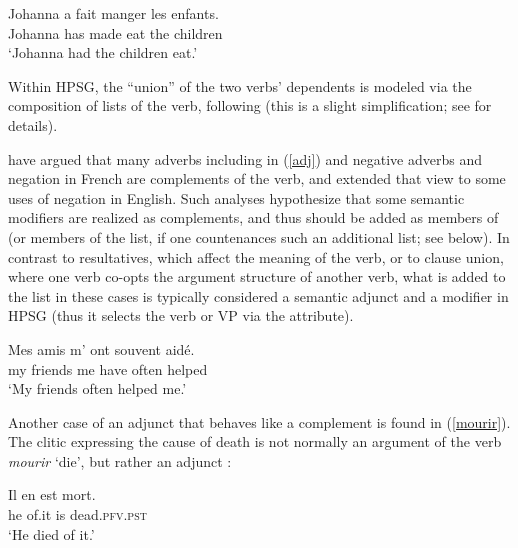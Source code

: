 \documentclass[output=paper
	        ,collection
	        ,collectionchapter
 	        ,biblatex
                ,babelshorthands
                ,newtxmath
                ,draftmode
                ,colorlinks, citecolor=brown
]{langscibook}
\begin{document}
\begin{exe}
\ex \label{faire}
\gll Johanna a fait manger les enfants. \\
Johanna has made eat the children \\
\glt `Johanna had the children eat.'
\end{exe}

\noindent
Within HPSG, the ``union'' of the two verbs' dependents is modeled via the composition of \argst lists of the  verb, following \citet{HinrichsandNakazawa1994} (this is a slight simplification; see   for details). 




\citet{AbeilleandGodard1997} have argued that many adverbs  including  in (\ref{adj}) and negative adverbs and negation in French are complements of the verb, and \citet{KimandSag2002} extended that view to some uses of negation in English. Such analyses hypothesize that some semantic modifiers are realized as complements, and thus should be added as members of \argst (or members of the \deps list, if one countenances such an additional list; see below). In contrast to resultatives,  which affect the meaning of the verb, or to clause union, where one verb co-opts the argument structure of another verb, what is added to the \argst list in these cases is typically considered a semantic adjunct and a modifier in HPSG (thus it selects the verb or VP via the  attribute). 

\begin{exe}
\ex\label{adj}
 \gll
	Mes amis m’ ont souvent aidé. \\
	my friends me have often helped \\
	\glt `My friends often helped me.'
\end{exe}


Another case of an adjunct that behaves like a complement is found in (\ref{mourir}).  The clitic  expressing the cause of death   is not normally an argument of the verb \textit{mourir} `die', but rather an adjunct \citep{KoenigandDavis2006}: %

\begin{exe}
	\ex\label{mourir}
	\gll Il en est mort. \\
	 he of.it is dead.\textsc{pfv.pst} \\
	 \glt `He died of it.' \citep[ex.\ 12a]{KoenigandDavis2006}
\end{exe}
\end{document}
